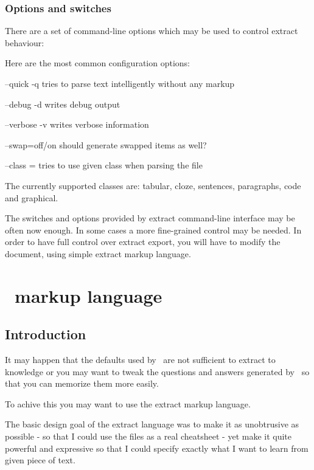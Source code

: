 \documentclass[a4paper,11pt]{article}
\newcommand{\probe}{\emph{\sc{probe{}}}}
\begin{document}
\subsubsection{Options and switches}
There are a set of command-line options which may be used to control extract
behaviour:

Here are the most common configuration options:

--quick -q tries to parse text intelligently without any markup

--debug -d writes debug output

--verbose -v writes verbose information

--swap=off/on should generate swapped items as well?

--class = tries to use given class when parsing the file

The currently supported classes are: tabular, cloze, sentences, paragraphs,
code and graphical.

The switches and options provided by extract command-line interface may be often
now enough. In some cases a more fine-grained control may be needed.
In order to have full control over extract export, you will have to modify the
document, using simple extract markup language.

\section{\probe\ markup language}
\subsection{Introduction}
It may happen that the defaults used by \probe\ are not sufficient to extract
to knowledge or you may want to tweak the questions and answers generated by
\probe\ so that you can memorize them more easily.

To achive this you may want to use the extract markup language.



The basic design goal of the extract language was to make it as unobtrusive as
possible - so that I could use the files as a real cheatsheet - yet make it
quite powerful and expressive so that I could specify exactly what I want to
learn from given piece of text.
\end{document}
